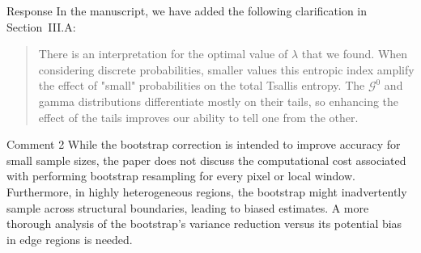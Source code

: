 \documentclass[11pt]{report}
\begin{document}
\begin{responsebox}{Response}
In the manuscript, we have added the following clarification in Section~III.A:
\begin{quote}
There is an interpretation for the optimal value of $\lambda$ that we found.
When considering discrete probabilities, smaller values this entropic index
amplify the effect of "small" probabilities on the total Tsallis entropy.
The $\mathcal G^0$ and gamma distributions differentiate mostly on their tails,
so enhancing the effect of the tails improves our ability to tell one from the other.

\end{quote}
\end{responsebox}

\vspace{1em}

\begin{reviewbox}{Comment 2}
While the bootstrap correction is intended to improve accuracy for small sample sizes, the paper does not discuss the computational cost associated with performing bootstrap resampling for every pixel or local window. Furthermore, in highly heterogeneous regions, the bootstrap might inadvertently sample across structural boundaries, leading to biased estimates. A more thorough analysis of the bootstrap’s variance reduction versus its potential bias in edge regions is needed.
\end{reviewbox}
\end{document}
